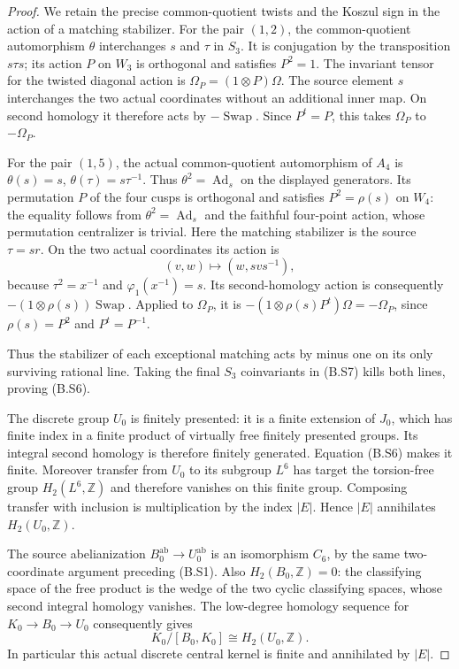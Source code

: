 \begin{proof}
We retain the precise common-quotient twists and the
Koszul sign in the action of a matching stabilizer.
For the pair $(1,2)$, the common-quotient automorphism
$\theta$ interchanges $s$ and $\tau$ in $S_3$.  It is
conjugation by the transposition $s\tau s$; its action
$P$ on $W_3$ is orthogonal and satisfies $P^2=1$.
The invariant tensor for the twisted diagonal action is
$\Omega_P=(1\otimes P)\Omega$.  The source element
$s$ interchanges the two actual coordinates without an
additional inner map.  On second homology it therefore
acts by $-\operatorname{Swap}$.  Since $P^t=P$, this
takes $\Omega_P$ to $-\Omega_P$.

For the pair $(1,5)$, the actual common-quotient
automorphism of $A_4$ is
$\theta(s)=s$, $\theta(\tau)=s\tau^{-1}$.
Thus $\theta^2=\operatorname{Ad}_s$ on the displayed
generators.  Its permutation $P$ of the four cusps is
orthogonal and satisfies $P^2=\rho(s)$ on $W_4$:
the equality follows from $\theta^2=\operatorname{Ad}_s$
and the faithful four-point action, whose permutation
centralizer is trivial.  Here the matching stabilizer
is the source $\tau=sr$.  On the two actual coordinates
its action is
\[
                 (v,w)\longmapsto(w,svs^{-1}),
\]
because $\tau^2=x^{-1}$ and $\varphi_1(x^{-1})=s$.
Its second-homology action is consequently
$-(1\otimes\rho(s))\operatorname{Swap}$.  Applied to
$\Omega_P$, it is
$-(1\otimes\rho(s)P^t)\Omega=-\Omega_P$, since
$\rho(s)=P^2$ and $P^t=P^{-1}$.

Thus the stabilizer of each exceptional matching acts
by minus one on its only surviving rational line.
Taking the final $S_3$ coinvariants in (B.S7) kills both
lines, proving (B.S6).

The discrete group $U_0$ is finitely presented: it is a
finite extension of $J_0$, which has finite index in a
finite product of virtually free finitely presented
groups.  Its integral second homology is therefore
finitely generated.  Equation (B.S6) makes it finite.
Moreover transfer from $U_0$ to its subgroup $L^6$ has
target the torsion-free group $H_2(L^6,\mathbb Z)$ and
therefore vanishes on this finite group.  Composing
transfer with inclusion is multiplication by the index
$|E|$.  Hence $|E|$ annihilates $H_2(U_0,\mathbb Z)$.

The source abelianization $B_0^{\mathrm{ab}}\to
U_0^{\mathrm{ab}}$ is an isomorphism $C_6$, by the
same two-coordinate argument preceding (B.S1).
Also $H_2(B_0,\mathbb Z)=0$: the classifying space of
the free product is the wedge of the two cyclic
classifying spaces, whose second integral homology
vanishes.  The low-degree homology sequence for
$K_0\to B_0\to U_0$ consequently gives
\[
        K_0/[B_0,K_0]\cong H_2(U_0,\mathbb Z).                 \tag{B.S8}
\]
In particular this actual discrete central kernel is
finite and annihilated by $|E|$.


\end{proof}
